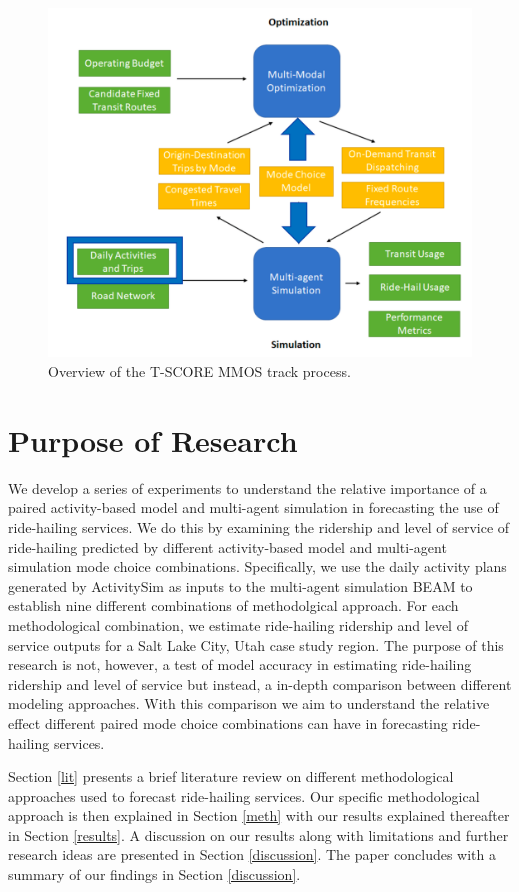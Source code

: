 \documentclass[fancy, masters]{byuthesis}
\begin{document}
\begin{figure}

{\centering \includegraphics[width=0.75\linewidth]{pics/mmos_mode} 

}

\caption{Overview of the T-SCORE MMOS track process.}\label{fig:mmos}
\end{figure}

\hypertarget{purpose-of-research}{%
\section{Purpose of Research}\label{purpose-of-research}}

We develop a series of experiments to understand the relative importance of a paired activity-based model and multi-agent simulation in forecasting the use of ride-hailing services. We do this by examining the ridership and level of service of ride-hailing predicted by different activity-based model and multi-agent simulation mode choice combinations. Specifically, we use the daily activity plans generated by ActivitySim as inputs to the multi-agent simulation BEAM to establish nine different combinations of methodolgical approach. For each methodological combination, we estimate ride-hailing ridership and level of service outputs for a Salt Lake City, Utah case study region. The purpose of this research is not, however, a test of model accuracy in estimating ride-hailing ridership and level of service but instead, a in-depth comparison between different modeling approaches. With this comparison we aim to understand the relative effect different paired mode choice combinations can have in forecasting ride-hailing services.

Section \ref{lit} presents a brief literature review on different methodological approaches used to forecast ride-hailing services. Our specific methodological approach is then explained in Section \ref{meth} with our results explained thereafter in Section \ref{results}. A discussion on our results along with limitations and further research ideas are presented in Section \ref{discussion}. The paper concludes with a summary of our findings in Section \ref{discussion}.
\end{document}
